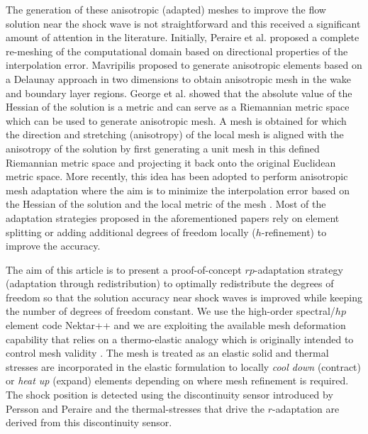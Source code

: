 \documentclass[review]{elsarticle}
\begin{document}
\par The generation of these anisotropic (adapted) meshes to improve the flow solution near the shock wave is not straightforward and this received a significant amount of attention in the literature.		 Initially,  Peraire et al. \cite{Peraire1987,Peraire1992} proposed a complete re-meshing of the computational domain based on directional properties of the interpolation error.	Mavripilis \cite{mavriplis1990} proposed to generate anisotropic elements based on a Delaunay approach in two dimensions to obtain anisotropic mesh in the wake and boundary layer regions.		George et al. \cite{George1991}  showed that the absolute value of the Hessian of the solution is a metric and can serve as a Riemannian metric space which can be used to generate anisotropic mesh.		A mesh is obtained for which the direction and stretching (anisotropy) of the local mesh is aligned with the anisotropy of the solution by first generating a unit mesh in this defined Riemannian metric space and projecting it back onto the original Euclidean metric space.		More recently, this idea has been adopted to perform anisotropic mesh adaptation where the aim is to minimize the interpolation error based on the Hessian of the solution and the local metric of the mesh \cite{Alauzet2016,Loseille2009b,Loseille2011a,Loseille2011b}.
Most of the adaptation strategies proposed in the aforementioned papers rely on element splitting or adding additional degrees of freedom locally ($h$-refinement) to improve the accuracy.


\par The aim of this article is to present a proof-of-concept $rp$-adaptation strategy (adaptation through redistribution) to optimally redistribute the degrees of freedom so that the solution accuracy near shock waves is improved while keeping the number of degrees of freedom constant.
	 We use the high-order spectral/$hp$ element code Nektar++ \cite{Cantwell2015} and we are exploiting the available mesh deformation capability that relies on a thermo-elastic analogy which is originally intended to control mesh validity \cite{Moxey2015}.		The mesh is treated as an elastic solid and thermal stresses are incorporated in the elastic formulation to locally {\it cool down} (contract) or {\it heat up} (expand) elements depending on where mesh refinement is required.		The shock position is detected using the discontinuity sensor introduced by Persson and Peraire \cite{Persson2006} and the thermal-stresses that drive the $r$-adaptation are derived from this discontinuity sensor.	
	
\end{document}
